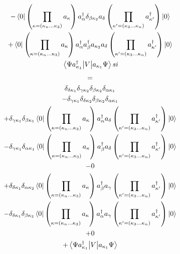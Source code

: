 \documentclass[12pt]{article}
\begin{document}
\begin{multline}
    -\bra{0}\left(\prod_{\kappa=\left(\kappa_{n}\dots\kappa_{3}\right)}a_{\kappa}\right)
        a^{\dag}_{\alpha}\delta_{\beta\kappa_{2}}a_{\delta}
    \left(\prod_{\kappa^{\prime}=\left(\kappa_{3}\dots\kappa_{n}\right)}a^{\dag}_{\kappa^{\prime}}\right)\ket{0}\\
    +\bra{0}\left(\prod_{\kappa=\left(\kappa_{n}\dots\kappa_{3}\right)}a_{\kappa}\right)
        a^{\dag}_{\alpha}a^{\dag}_{\beta}a_{\kappa_{2}}a_{\delta}
    \left(\prod_{\kappa^{\prime}=\left(\kappa_{3}\dots\kappa_{n}\right)}a^{\dag}_{\kappa^{\prime}}\right)\ket{0}\\
    \mel{\Psi a^{\dag}_{\kappa_{1}}}{V}{a_{\kappa_{1}}\Psi}si
\end{multline}
\begin{multline}
    =\\
    \delta_{\delta\kappa_{1}}\delta_{\gamma\kappa_{2}}\delta_{\beta\kappa_{2}}\delta_{\alpha\kappa_{1}}\\
    -\delta_{\gamma\kappa_{1}}\delta_{\delta\kappa_{2}}\delta_{\beta\kappa_{2}}\delta_{\alpha\kappa_{1}}\\
    +\delta_{\gamma\kappa_{1}}\delta_{\beta\kappa_{1}}
    \bra{0}\left(\prod_{\kappa=\left(\kappa_{n}\dots\kappa_{3}\right)}a_{\kappa}\right)
        a^{\dag}_{\alpha}a_{\delta}
    \left(\prod_{\kappa^{\prime}=\left(\kappa_{3}\dots\kappa_{n}\right)}a^{\dag}_{\kappa^{\prime}}\right)\ket{0}\\
    -\delta_{\gamma\kappa_{1}}\delta_{\alpha\kappa_{1}}
    \bra{0}\left(\prod_{\kappa=\left(\kappa_{n}\dots\kappa_{3}\right)}a_{\kappa}\right)
        a^{\dag}_{\beta}a_{\delta}
    \left(\prod_{\kappa^{\prime}=\left(\kappa_{3}\dots\kappa_{n}\right)}a^{\dag}_{\kappa^{\prime}}\right)\ket{0}\\
    -0\\
    +\delta_{\delta\kappa_{1}}\delta_{\alpha\kappa_{2}}
    \bra{0}\left(\prod_{\kappa=\left(\kappa_{n}\dots\kappa_{3}\right)}a_{\kappa}\right)
        a^{\dag}_{\beta}a_{\gamma}
    \left(\prod_{\kappa^{\prime}=\left(\kappa_{3}\dots\kappa_{n}\right)}a^{\dag}_{\kappa^{\prime}}\right)\ket{0}\\
    -\delta_{\delta\kappa_{1}}\delta_{\beta\kappa_{2}}
    \bra{0}\left(\prod_{\kappa=\left(\kappa_{n}\dots\kappa_{3}\right)}a_{\kappa}\right)
        a^{\dag}_{\alpha}a_{\gamma}
    \left(\prod_{\kappa^{\prime}=\left(\kappa_{3}\dots\kappa_{n}\right)}a^{\dag}_{\kappa^{\prime}}\right)\ket{0}\\
    +0\\
    +\mel{\Psi a^{\dag}_{\kappa_{1}}}{V}{a_{\kappa_{1}}\Psi}\\
\end{multline}
\end{document}
